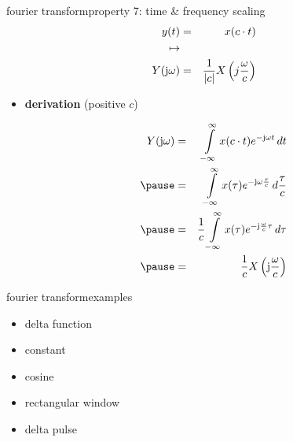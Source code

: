         \begin{frame}{fourier transform}{property 7: time \& frequency scaling}
            \vspace{-5mm}
            \begin{eqnarray*}
                y(t) &=& x(c\cdot t)\\ \mapsto&&\\ Y(\mathrm{j}\omega) &=& \frac{1}{|c|}X\left(j\frac{\omega}{c}\right) 
            \end{eqnarray*}
            \pause
            \begin{itemize}
                \item[]	\textbf{derivation} (positive $c$)
                \begin{footnotesize}
                    \begin{eqnarray*}
                        Y(\jom) &=& \int\limits_{-\infty}^{\infty} {x(c\cdot t) \e^{-\jom t}\, dt}\nonumber\\
                        \pause
                        &=& \int\limits_{-\infty}^{\infty} {x(\tau) \e^{-\jom \frac{\tau}{c}}\, d\frac{\tau}{c}}\nonumber\\
                        \pause
                        &=& \frac{1}{c}\int\limits_{-\infty}^{\infty} {x(\tau) \e^{-\mathrm{j} \frac{\omega}{c} \tau}\, d\tau}\nonumber\\
                        \pause
                        &=& \frac{1}{c} X\left(\mathrm{j}\frac{\omega}{c}\right) \nonumber
                    \end{eqnarray*}
                \end{footnotesize}
            \end{itemize}
        \end{frame}	

        \begin{frame}{fourier transform}{examples}
                \begin{itemize}
                    \item	delta function
                    \item	constant
                    \item	cosine
                    \item	rectangular window
                    \item	delta pulse
                \end{itemize}
        \end{frame}	

